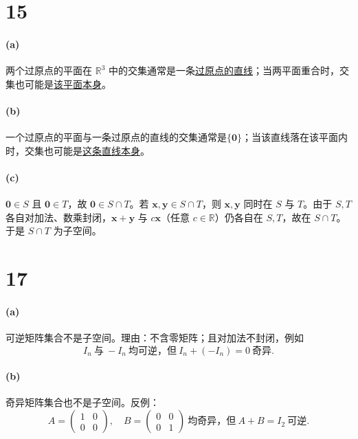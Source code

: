 \documentclass[12pt]{ctexart}
\begin{document}
\section*{15}
\paragraph{(a)} 两个过原点的平面在 $\mathbb{R}^3$ 中的交集通常是一条\underline{过原点的直线}；当两平面重合时，交集也可能是\underline{该平面本身}。

\paragraph{(b)} 一个过原点的平面与一条过原点的直线的交集通常是\underline{$\{\mathbf{0}\}$}；当该直线落在该平面内时，交集也可能是\underline{这条直线本身}。

\paragraph{(c)} $\mathbf{0}\in S$ 且 $\mathbf{0}\in T$，故 $\mathbf{0}\in S\cap T$。若 $\mathbf{x},\mathbf{y}\in S\cap T$，则 $\mathbf{x},\mathbf{y}$ 同时在 $S$ 与 $T$。由于 $S,T$ 各自对加法、数乘封闭，$\mathbf{x}+\mathbf{y}$ 与 $c\mathbf{x}$（任意 $c\in\mathbb{R}$）仍各自在 $S,T$，故在 $S\cap T$。于是 $S\cap T$ 为子空间。

\section*{17}
\paragraph{(a)} 可逆矩阵集合不是子空间。理由：不含零矩阵；且对加法不封闭，例如
\[
I_n\ \text{与}\ -I_n\ \text{均可逆，但}\ I_n+(-I_n)=0\ \text{奇异}.
\]

\paragraph{(b)} 奇异矩阵集合也不是子空间。反例：
\[
A=\begin{pmatrix}1&0\\0&0\end{pmatrix},\quad
B=\begin{pmatrix}0&0\\0&1\end{pmatrix}\ \text{均奇异，但}\ A+B=I_2\ \text{可逆}.\]
\end{document}
